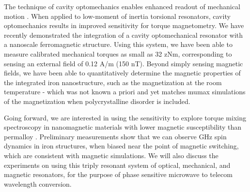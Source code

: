 The technique of cavity optomechanics enables enhanced readout of mechanical motion \cite{Aspelmeyer_2014}.  When applied to low-moment of inertia torsional resonators, cavity optomechanics results in improved sensitivity for torque magnetometry.  We have recently demonstrated the integration of a cavity optomechanical resonator with a nanoscale ferromagnetic structure.  Using this system, we have been able to measure calibrated mechanical torques as small as 32 zNm, corresponding to sensing an external field of 0.12 A/m (150 nT).  Beyond simply sensing magnetic fields, we have been able to quantitatively determine the magnetic properties of the integrated iron nanostructure, such as the magnetization at the room temperature - which was not known a priori and yet matches mumax simulations of the magnetization when polycrystalline disorder is included.

Going forward, we are interested in using the sensitivity to explore torque mixing spectroscopy in nanomagnetic materials with lower magnetic susceptibility than permalloy \cite{Losby_2015}.  Preliminary measurements show that we can observe GHz spin dynamics in iron structures, when biased near the point of magnetic switching, which are consistent with magnetic simulations.  We will also discuss the experiments on using this triply resonant system of optical, mechanical, and magnetic resonators, for the purpose of phase sensitive microwave to telecom wavelength conversion.